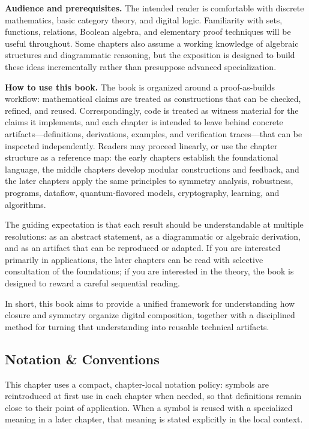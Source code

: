 \documentclass[11pt]{article}
\begin{document}
\medskip
\noindent\textbf{Audience and prerequisites.} The intended reader is comfortable with discrete mathematics, basic category theory, and digital logic. Familiarity with sets, functions, relations, Boolean algebra, and elementary proof techniques will be useful throughout. Some chapters also assume a working knowledge of algebraic structures and diagrammatic reasoning, but the exposition is designed to build these ideas incrementally rather than presuppose advanced specialization.

\medskip
\noindent\textbf{How to use this book.} The book is organized around a proof-as-builds workflow: mathematical claims are treated as constructions that can be checked, refined, and reused. Correspondingly, code is treated as witness material for the claims it implements, and each chapter is intended to leave behind concrete artifacts---definitions, derivations, examples, and verification traces---that can be inspected independently. Readers may proceed linearly, or use the chapter structure as a reference map: the early chapters establish the foundational language, the middle chapters develop modular constructions and feedback, and the later chapters apply the same principles to symmetry analysis, robustness, programs, dataflow, quantum-flavored models, cryptography, learning, and algorithms.

\medskip
\noindent The guiding expectation is that each result should be understandable at multiple resolutions: as an abstract statement, as a diagrammatic or algebraic derivation, and as an artifact that can be reproduced or adapted. If you are interested primarily in applications, the later chapters can be read with selective consultation of the foundations; if you are interested in the theory, the book is designed to reward a careful sequential reading.

\medskip
\noindent In short, this book aims to provide a unified framework for understanding how closure and symmetry organize digital composition, together with a disciplined method for turning that understanding into reusable technical artifacts.



\subsection{Notation \& Conventions}


This chapter uses a compact, chapter-local notation policy: symbols are reintroduced at first use in each chapter when needed, so that definitions remain close to their point of application. When a symbol is reused with a specialized meaning in a later chapter, that meaning is stated explicitly in the local context.
\end{document}
